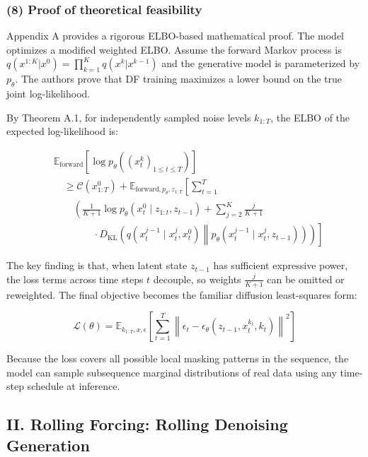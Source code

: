 \hypertarget{proof-of-theoretical-feasibility}{%
\subsubsection{(8) Proof of theoretical feasibility}\label{proof-of-theoretical-feasibility}}

Appendix A provides a rigorous ELBO-based mathematical proof. The model optimizes a modified weighted ELBO. Assume the forward Markov process is \(q(x^{1:K}|x^0)=\prod_{k=1}^K q(x^k|x^{k-1})\) and the generative model is parameterized by \(p_\theta\). The authors prove that DF training maximizes a lower bound on the true joint log-likelihood.

By Theorem A.1, for independently sampled noise levels \(k_{1:T}\), the ELBO of the expected log-likelihood is:

\[
\begin{aligned}
&\mathbb{E}_{\mathrm{forward}}
\left[
\log p_\theta\left((x_t^k)_{1\le t\le T}\right)
\right] \\
&\quad \ge \mathcal{C}(x_{1:T}^0)
+\mathbb{E}_{\mathrm{forward},p_\theta,z_{1:T}}
\left[
\sum_{t=1}^T
\right. \\
&\qquad \left.
\left(
\frac{1}{K+1}\log p_\theta(x_t^0\mid z_{1:t},z_{t-1})
+\sum_{j=2}^K\frac{j}{K+1}
\right.
\right. \\
&\qquad\qquad \left.\left.
{}\cdot D_{\mathrm{KL}}\left(
q(x_t^{j-1}\mid x_t^j,x_t^0)
\middle\|
p_\theta(x_t^{j-1}\mid x_t^j,z_{t-1})
\right)
\right)
\right]
\end{aligned}
\]

The key finding is that, when latent state \(z_{t-1}\) has sufficient expressive power, the loss terms across time steps \(t\) decouple, so weights \(\frac{j}{K+1}\) can be omitted or reweighted. The final objective becomes the familiar diffusion least-squares form:

\[
\mathcal{L}(\theta)=
\mathbb{E}_{k_{1:T},x,\epsilon}
\left[
\sum_{t=1}^T
\left\|
\epsilon_t-\epsilon_\theta(z_{t-1},x_t^{k_t},k_t)
\right\|^2
\right]
\]

Because the loss covers all possible local masking patterns in the sequence, the model can sample subsequence marginal distributions of real data using any time-step schedule at inference.

\hypertarget{ii.-rolling-forcing-rolling-denoising-generation}{%
\subsection{II. Rolling Forcing: Rolling Denoising Generation}\label{ii.-rolling-forcing-rolling-denoising-generation}}

